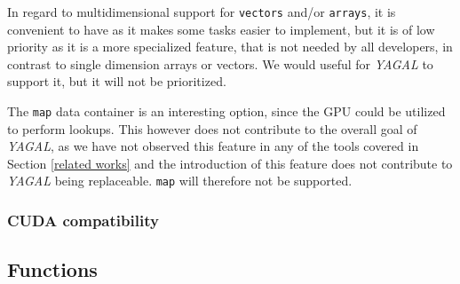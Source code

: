 In regard to multidimensional support for \texttt{vectors} and/or \texttt{arrays}, it is convenient to have as it makes some tasks easier to implement, but it is of low priority as it is a more specialized feature, that is not needed by all developers, in contrast to single dimension arrays or vectors. We would useful for \textit{YAGAL} to support it, but it will not be prioritized.

The \texttt{map} data container is an interesting option, since the GPU could be utilized to perform lookups. This however does not contribute to the overall goal of \textit{YAGAL}, as we have not observed this feature in any of the tools covered in Section \ref{related works} and the introduction of this feature does not contribute to \textit{YAGAL} being replaceable. \texttt{map} will therefore not be supported.

\subsubsection{CUDA compatibility}

\subsection{Functions}
